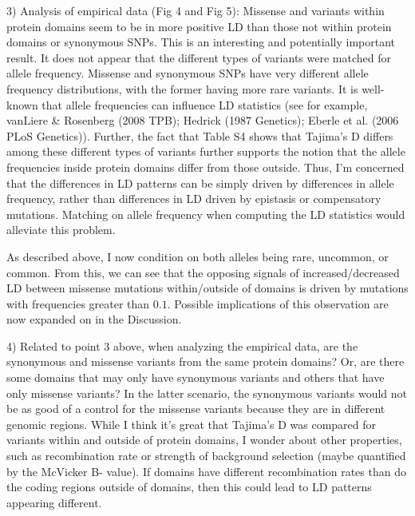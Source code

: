 \documentclass{article}
\newenvironment{response}%
  {\list{}{\leftmargin=0.5in\rightmargin=0.5in\color{blue}}\item[]}%
  {\endlist}
\begin{document}
3) Analysis of empirical data (Fig 4 and Fig 5): Missense and variants within
protein domains seem to be in more positive LD than those not within protein
domains or synonymous SNPs. This is an interesting and potentially important
result. It does not appear that the different types of variants were matched
for allele frequency. Missense and synonymous SNPs have very different allele
frequency distributions, with the former having more rare variants. It is
well-known that allele frequencies can influence LD statistics (see for
example, vanLiere \& Rosenberg (2008 TPB); Hedrick (1987 Genetics); Eberle et
al. (2006 PLoS Genetics)). Further, the fact that Table S4 shows that Tajima's
D differs among these different types of variants further supports the notion
that the allele frequencies inside protein domains differ from those outside.
Thus, I'm concerned that the differences in LD patterns can be simply driven by
differences in allele frequency, rather than differences in LD driven by
epistasis or compensatory mutations. Matching on allele frequency when
computing the LD statistics would alleviate this problem.

\begin{response}
    As described above, I now condition on both alleles being rare, uncommon,
    or common. From this, we can see that the opposing signals of increased/decreased
    LD between missense mutations within/outside of domains is driven by
    mutations with frequencies greater than $0.1$. Possible implications of this
    observation are now expanded on in the Discussion.
\end{response}

4) Related to point 3 above, when analyzing the empirical data, are the
synonymous and missense variants from the same protein domains? Or, are there
some domains that may only have synonymous variants and others that have only
missense variants? In the latter scenario, the synonymous variants would not be
as good of a control for the missense variants because they are in different
genomic regions. While I think it's great that Tajima's D was compared for
variants within and outside of protein domains, I wonder about other
properties, such as recombination rate or strength of background selection
(maybe quantified by the McVicker B- value). If domains have different
recombination rates than do the coding regions outside of domains, then this
could lead to LD patterns appearing different.
\end{document}
